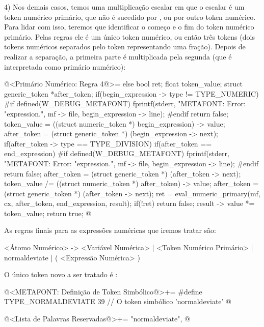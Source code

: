 4) Nos demais casos, temos uma multiplicação escalar em que o escalar
é um token numérico primário, que não é sucedido
por \monoespaco{+}, \monoespaco{-} ou por outro token numérico. Para
lidar com isso, teremos que identificar o começo e o fim do token
numérico primário. Pelas regras ele é um único token numérico, ou
então três tokens (dois tokens numéricos separados pelo
token \monoespaco{/} representando uma fração). Depois de realizar a
separação, a primeira parte é multiplicada pela segunda (que é
interpretada como primário numérico):

\iniciocodigo
@<Primário Numérico: Regra 4@>=
else{
  bool ret;
  float token_value;
  struct generic_token *after_token;
  if(begin_expression -> type != TYPE_NUMERIC){
#if defined(W_DEBUG_METAFONT)
    fprintf(stderr, "METAFONT: Error: %
            "expression.\n", mf -> file, begin_expression -> line);
#endif
    return false;
  }
  token_value = ((struct numeric_token *) begin_expression) -> value;
  after_token = (struct generic_token *) (begin_expression -> next);
  if(after_token -> type == TYPE_DIVISION){
    if(after_token == end_expression){
#if defined(W_DEBUG_METAFONT)
      fprintf(stderr, "METAFONT: Error: %
              "expression.\n", mf -> file, begin_expression -> line);
#endif
      return false;
    }
    after_token = (struct generic_token *) (after_token -> next);
    token_value /= ((struct numeric_token *) after_token) -> value;
    after_token = (struct generic_token *) (after_token -> next);
  }
  ret = eval_numeric_primary(mf, cx, after_token, end_expression, result);
  if(!ret)
    return false;
  result -> value *= token_value;
  return true;
}
@
\fimcodigo


As regras finais para as expressões numéricas que iremos tratar são:

\alinhaverbatim
<Átomo Numérico> -> <Variável Numérica> |
                    <Token Numérico Primário> |
                    normaldeviate |
                    ( <Expressão Numérica> )
\alinhanormal

O único token novo a ser tratado é :

\iniciocodigo
@<METAFONT: Definição de Token Simbólico@>+=
#define TYPE_NORMALDEVIATE  39 // O token simbólico 'normaldeviate'
@
\fimcodigo

\iniciocodigo
@<Lista de Palavras Reservadas@>+=
"normaldeviate",
@
\fimcodigo

